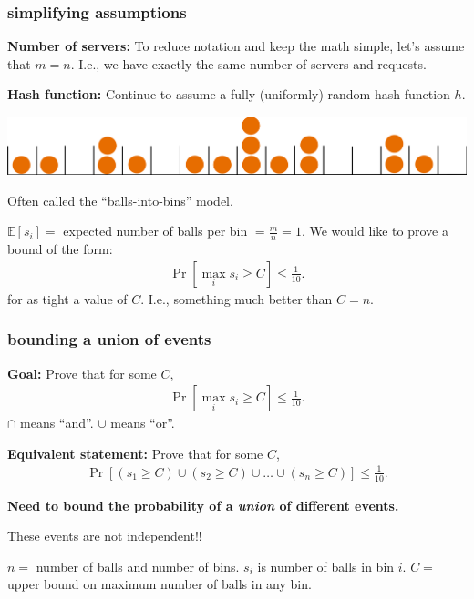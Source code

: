 \documentclass[compress]{beamer}
\newcommand{\E}{\mathbb{E}}
\begin{document}
\begin{frame}
	\frametitle{simplifying assumptions}
	\textbf{Number of servers:} To reduce notation and keep the math simple, let's assume that $m = n$. I.e., we have exactly the same number of servers and requests. 
	
	\textbf{Hash function:} Continue to assume a fully (uniformly) random hash function $h$.
	
	\begin{center}
		\includegraphics[width=.8\textwidth]{balls_into_bins.png}
		
		Often called the ``balls-into-bins'' model. 
	\end{center}
	
	$\E[s_i] = $ expected number of balls per bin $=\frac{m}{n} = 1$. We would like to prove a bound of the form:
	\begin{align*}
		\Pr[\max_i s_i \geq C] \leq \frac{1}{10}. 
	\end{align*}
	for as tight a value of $C$. I.e., something much better than $C = n$. 
\end{frame}

\begin{frame}
	\frametitle{bounding a union of events}
	\textbf{Goal:} Prove that for some $C$,
	\begin{align*}
		\Pr[\max_i s_i \geq C] \leq \frac{1}{10}. 
	\end{align*}
	 $\cap$ means ``and''. $\cup$ means ``or''.
	
	\textbf{Equivalent statement:} Prove that for some $C$, 
	\begin{align*}
		\Pr[(s_1 \geq C) \cup (s_2 \geq C) \cup \ldots \cup (s_n \geq C)] \leq \frac{1}{10}. 
	\end{align*}
	
	\begin{center}
		\textbf{\alert{Need to bound the probability of a \emph{union} of different events.}}
		
		These events are not independent!!
	\end{center}
	
	\vspace{1em}
	\begin{block}{\vspace*{-3ex}}
		\small $n = $ number of balls and number of bins. $s_i$ is number of balls in bin $i$. $C =$ upper bound on maximum number of balls in any bin.
	\end{block}
\end{frame}
\end{document}
